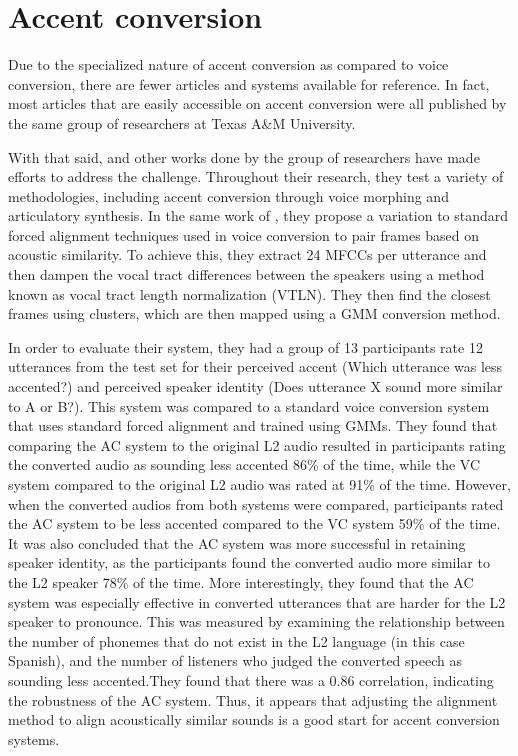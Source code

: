\documentclass
[
    a4paper,
    twoside,
    12pt
]
{report}
\begin{document}
\hypertarget{accent-conversion}{%
\section{Accent conversion}\label{accent-conversion}}

Due to the specialized nature of accent conversion as compared to voice
conversion, there are fewer articles and systems available for
reference. In fact, most articles that are easily accessible on accent
conversion were all published by the same group of researchers at Texas
A\&M University.

With that said, \textcite{aryal2014} and other works done by the group
of researchers have made efforts to address the challenge. Throughout
their research, they test a variety of methodologies, including accent
conversion through voice morphing and articulatory synthesis. In the
same work of \textcite{aryal2014}, they propose a variation to standard
forced alignment techniques used in voice conversion to pair frames
based on acoustic similarity. To achieve this, they extract 24 MFCCs per
utterance and then dampen the vocal tract differences between the
speakers using a method known as vocal tract length normalization
(VTLN). They then find the closest frames using clusters, which are then
mapped using a GMM conversion method.

In order to evaluate their system, they had a group of 13 participants
rate 12 utterances from the test set for their perceived accent (Which
utterance was less accented?) and perceived speaker identity (Does
utterance X sound more similar to A or B?). This system was compared to
a standard voice conversion system that uses standard forced alignment
and trained using GMMs. They found that comparing the AC system to the
original L2 audio resulted in participants rating the converted audio as
sounding less accented 86\% of the time, while the VC system compared to
the original L2 audio was rated at 91\% of the time. However, when the
converted audios from both systems were compared, participants rated the
AC system to be less accented compared to the VC system 59\% of the
time. It was also concluded that the AC system was more successful in
retaining speaker identity, as the participants found the converted
audio more similar to the L2 speaker 78\% of the time. More
interestingly, they found that the AC system was especially effective in
converted utterances that are harder for the L2 speaker to pronounce.
This was measured by examining the relationship between the number of
phonemes that do not exist in the L2 language (in this case Spanish),
and the number of listeners who judged the converted speech as sounding
less accented.They found that there was a 0.86 correlation, indicating
the robustness of the AC system. Thus, it appears that adjusting the
alignment method to align acoustically similar sounds is a good start
for accent conversion systems.
\end{document}
